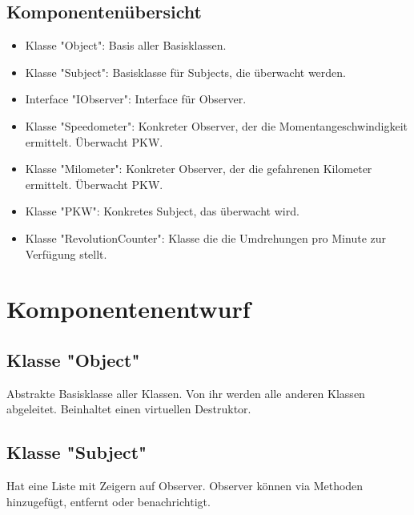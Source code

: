 \documentclass[12pt,a4paper]{article}
\begin{document}
\subsection {Komponentenübersicht}
\begin {itemize} 
	\item Klasse "Object":
	\newline
	Basis aller Basisklassen.
	
	\item Klasse "Subject":
	\newline
	Basisklasse für Subjects, die überwacht werden.
	
	\item Interface "IObserver":
	\newline
	Interface für Observer.
	
	\item Klasse "Speedometer":
	\newline	
	Konkreter Observer, der die Momentangeschwindigkeit ermittelt. Überwacht PKW.
	
	\item Klasse "Milometer":
	\newline
	Konkreter Observer, der die gefahrenen Kilometer ermittelt. Überwacht PKW.
	
	\item Klasse "PKW":
	\newline
	Konkretes Subject, das überwacht wird.
	
	\item Klasse "RevolutionCounter":
	\newline
	Klasse die die Umdrehungen pro Minute zur Verfügung stellt.
		
\end {itemize}

\newpage
\section {Komponentenentwurf}
\subsection {Klasse "Object"}
Abstrakte Basisklasse aller Klassen. Von ihr werden alle anderen Klassen abgeleitet. Beinhaltet einen virtuellen Destruktor.

\subsection {Klasse "Subject"}
Hat eine Liste mit Zeigern auf Observer. Observer können via Methoden hinzugefügt, entfernt oder benachrichtigt.
\\
\end{document}
